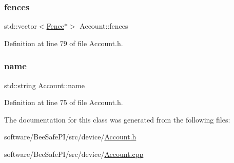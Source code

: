 \subsubsection{\texorpdfstring{fences}{fences}}
{\footnotesize\ttfamily std\+::vector$<$\hyperlink{class_fence}{Fence}$\ast$$>$ Account\+::fences\hspace{0.3cm}{\ttfamily [private]}}



Definition at line 79 of file Account.\+h.

\mbox{\label{class_account_a586e2c3461c5231eacf7c96851024a75}} 
\subsubsection{\texorpdfstring{name}{name}}
{\footnotesize\ttfamily std\+::string Account\+::name\hspace{0.3cm}{\ttfamily [private]}}



Definition at line 75 of file Account.\+h.



The documentation for this class was generated from the following files\+:\begin{DoxyCompactItemize}
\item 
software/\+Bee\+Safe\+P\+I/src/device/\hyperlink{_account_8h}{Account.\+h}\item 
software/\+Bee\+Safe\+P\+I/src/device/\hyperlink{_account_8cpp}{Account.\+cpp}\end{DoxyCompactItemize}
